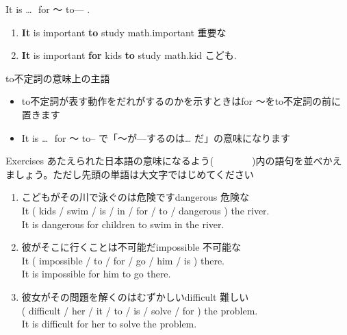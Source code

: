 \documentclass[aspectratio=169,xcolor={dvipsnames,table}]{beamer}
\begin{document}
\begin{frame}[plain]{It is \ldots\,\, for ～ to--- .}
 \large

\begin{enumerate}
 \item {\bfseries It} is important {\bfseries to} study math.\hfill{\scriptsize important  重要な}
 \item {\bfseries It} is important {\bfseries for} kids {\bfseries to} study math.\hfill{\scriptsize kid  こども}.
\end{enumerate}

\begin{block}{to不定詞の意味上の主語}\small
\begin{itemize}[square]
 \item to不定詞が表す動作をだれがするのかを示すときはfor ～をto不定詞の前に置きます
 \item It is \ldots\,\, for ～ to--\,\,で「～が---するのは\ldots\,\,だ」の意味になります
\end{itemize}
 
\end{block}
\end{frame}
\begin{frame}[plain]{Exercises}
 あたえられた日本語の意味になるよう(~~~~~~~~)内の語句を並べかえましょう。ただし先頭の単語は大文字ではじめてください

\begin{enumerate}
 \item こどもがその川で泳ぐのは危険です\hfill{\scriptsize dangerous  危険な}\\
It ( kids / swim / is / in / for / to / dangerous ) the river.\\
It is dangerous for children to swim in the river.
 \item 彼がそこに行くことは不可能だ\hfill{\scriptsize impossible  不可能な}\\
It ( impossible / to / for / go / him / is ) there.\\
It is impossible for him to go there.
 \item 彼女がその問題を解くのはむずかしい\hfill{\scriptsize difficult  難しい}\\
( difficult / her / it / to / is / solve / for ) the problem.\\
It is difficult for her to solve the problem.

\end{enumerate}
\end{frame}
\end{document}
